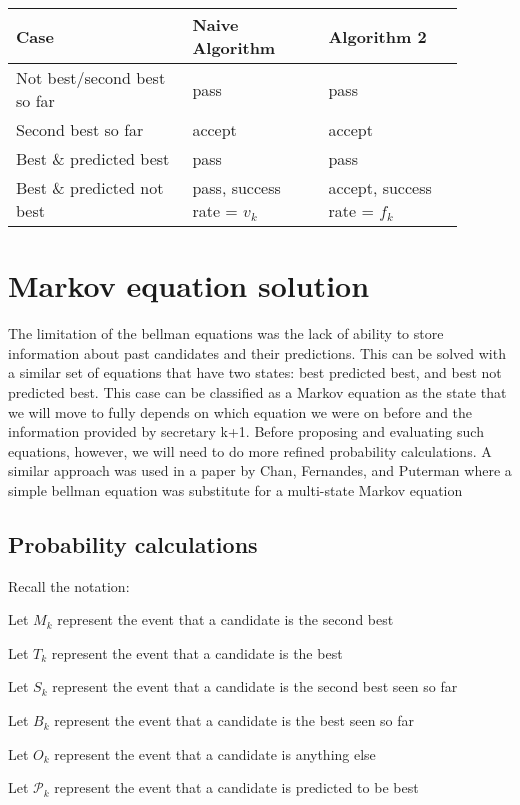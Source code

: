 \documentclass[a4paper,11pt]{article}
\begin{document}
\begin{tabular}{|p{0.35\linewidth}|p{0.27\linewidth}|p{0.27\linewidth}|}

\hline
Case & Naive Algorithm & Algorithm 2\\
\hline
Not best/second best so far & pass & pass\\
\hline
Second best so far & accept & accept\\
\hline
Best \& predicted best & pass & pass\\
\hline
Best \& predicted not best & pass, success rate = $v_k$ & accept, success rate = $f_k$\\
\hline
\end{tabular}

\section{Markov equation solution}

The limitation of the bellman equations was the lack of ability to store information about past candidates and their predictions. This can be solved with a similar set of equations that have two states: best predicted best, and best not predicted best. This case can be classified as a Markov equation as the state that we will move to fully depends on which equation we were on before and the information provided by secretary k+1. Before proposing and evaluating such equations, however, we will need to do more refined probability calculations. A similar approach was used in a paper by Chan, Fernandes, and Puterman where a simple bellman equation was substitute for a multi-state Markov equation\cite{Chan_Fernandes_Puterman_2021}

\subsection{Probability calculations}

Recall the notation:

Let $M_k$ represent the event that a candidate is the second best

Let $T_k$ represent the event that a candidate is the best

Let $S_k$ represent the event that a candidate is the second best seen so far

Let $B_k$ represent the event that a candidate is the best seen so far

Let $O_k$ represent the event that a candidate is anything else

Let $\mathcal{P}_k$ represent the event that a candidate is predicted to be best
\end{document}
